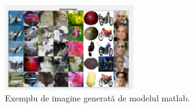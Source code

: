 \documentclass[conference]{IEEEtran}
\begin{document}
\begin{figure}[htbp]
\centerline{\includegraphics[width=0.5\textwidth]{fig1.png}}
\caption{Exemplu de imagine generată de modelul matlab.}
\label{fig}
\end{figure}


\nocite{*}



\end{document}
